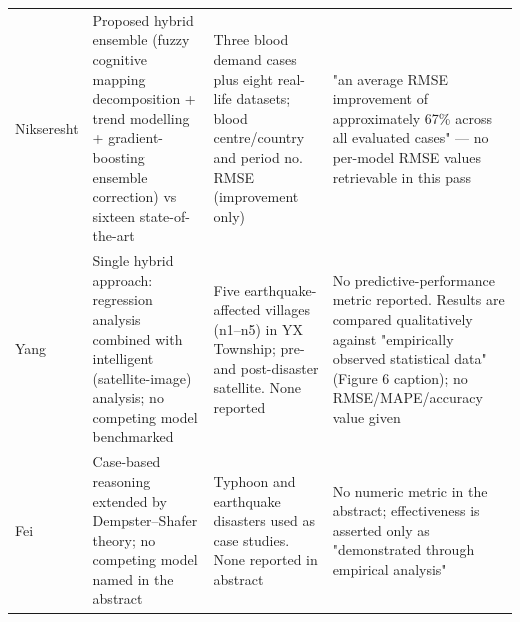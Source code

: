 \begin{table}[htbp!]
\begin{tabular}{@{}p{2.3cm}p{3.5cm}p{2.7cm}p{5.4cm}@{}}
Nikseresht \cite{Nikseresht2025BloodDemandEnsemble} & Proposed hybrid ensemble (fuzzy cognitive mapping decomposition + trend modelling + gradient-boosting ensemble correction) vs sixteen state-of-the-art & Three blood demand cases plus eight real-life datasets; blood centre/country and period no. RMSE (improvement only) & "an average RMSE improvement of approximately 67\% across all evaluated cases" --- no per-model RMSE values retrievable in this pass \\[2pt]
Yang \cite{Yang2025CasualtyEmergencyMaterial} & Single hybrid approach: regression analysis combined with intelligent (satellite-image) analysis; no competing model benchmarked & Five earthquake-affected villages (n1--n5) in YX Township; pre- and post-disaster satellite. None reported & No predictive-performance metric reported. Results are compared qualitatively against "empirically observed statistical data" (Figure 6 caption); no RMSE/MAPE/accuracy value given \\[2pt]
Fei \cite{Fei2022DemandTheory} & Case-based reasoning extended by Dempster--Shafer theory; no competing model named in the abstract & Typhoon and earthquake disasters used as case studies. None reported in abstract & No numeric metric in the abstract; effectiveness is asserted only as "demonstrated through empirical analysis" \\[2pt]
\bottomrule
\end{tabular}
\normalsize
\end{table}
